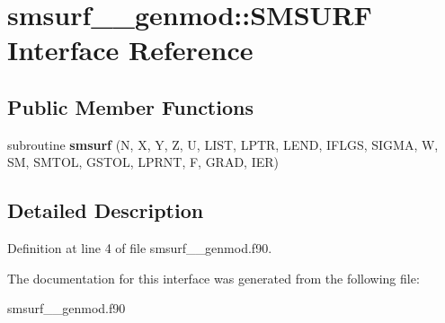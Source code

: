 \hypertarget{interfacesmsurf____genmod_1_1_s_m_s_u_r_f}{\section{smsurf\+\_\+\+\_\+genmod\+:\+:S\+M\+S\+U\+R\+F Interface Reference}
\label{interfacesmsurf____genmod_1_1_s_m_s_u_r_f}
}
\subsection*{Public Member Functions}
\begin{DoxyCompactItemize}
\item 
\hypertarget{interfacesmsurf____genmod_1_1_s_m_s_u_r_f_a0378153c883e33fed81461ec77ff2a72}{subroutine {\bfseries smsurf} (N, X, Y, Z, U, L\+I\+S\+T, L\+P\+T\+R, L\+E\+N\+D, I\+F\+L\+G\+S, S\+I\+G\+M\+A, W, S\+M, S\+M\+T\+O\+L, G\+S\+T\+O\+L, L\+P\+R\+N\+T, F, G\+R\+A\+D, I\+E\+R)}\label{interfacesmsurf____genmod_1_1_s_m_s_u_r_f_a0378153c883e33fed81461ec77ff2a72}

\end{DoxyCompactItemize}


\subsection{Detailed Description}


Definition at line 4 of file smsurf\+\_\+\+\_\+genmod.\+f90.



The documentation for this interface was generated from the following file\+:\begin{DoxyCompactItemize}
\item 
smsurf\+\_\+\+\_\+genmod.\+f90\end{DoxyCompactItemize}
